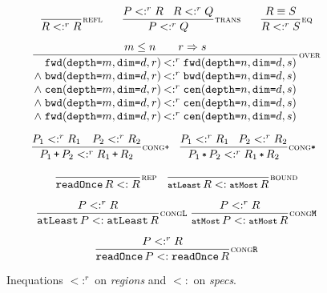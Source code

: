 \documentclass[9pt]{sigplanconf}
\theoremstyle{definition}
\newcommand{\term}[1]{\texttt{#1}}
\newcommand{\stenFwdSR}[3]{\term{fwd} (\term{depth=}#1,
  \term{dim=}#2, #3)}
\newcommand{\stenBwdSR}[3]{\term{bwd} (\term{depth=}#1,
  \term{dim=}#2, #3)}
\newcommand{\stenCenSR}[3]{\term{cen} (\term{depth=}#1,
  \term{dim=}#2, #3)}
\newcommand{\trule}[1]{\footnotesize{#1}}
\begin{document}
\begin{figure}[t]
\begin{align*}
\begin{array}{c}
%
\dfrac{}{R <:^r R}\trule{\textsc{refl}} \qquad \dfrac{P <:^r R \quad R <:^r Q}{P <:^r
  Q}\trule{\textsc{trans}} 
\qquad
\dfrac{R \equiv S}{R <:^r S}\trule{\textsc{eq}} 
\\[1.5em]
\setlength{\arraycolsep}{0.1em}
\dfrac{\hspace{3em} m \leq n \qquad r \Rightarrow s \hspace{3em}}
{\begin{array}{rl}
\stenFwdSR{m}{d}{r} & <:^r \stenFwdSR{n}{d}{s}
\\
\wedge \; \stenBwdSR{m}{d}{r} & <:^r \stenBwdSR{n}{d}{s}
\\
\wedge \; \stenCenSR{m}{d}{r} & <:^r \stenCenSR{n}{d}{s}
\\
\wedge \; \stenBwdSR{m}{d}{r} & <:^r \stenCenSR{n}{d}{s} \\
\wedge \; \stenFwdSR{m}{d}{r} & <:^r \stenCenSR{n}{d}{s} \\[1em]
\end{array}}\trule{\textsc{over}} \\
\hspace{-0.5em}
\dfrac{P_1 <:^r R_1 \quad P_2 <:^r R_2}
      {P_1 \, \texttt{+} \, P_2 <:^r R_1 \, \texttt{+} \, R_2}
\trule{\textsc{cong}\texttt{+}} \;\;\;
\dfrac{P_1 <:^r R_1 \quad P_2 <:^r R_2}
      {P_1 \, \texttt{*} \, P_2 <:^r R_1 \, \texttt{*} \, R_2}
\trule{\textsc{cong}\texttt{*}} \\[1.5em]
%
\dfrac{}{\term{readOnce} \, R <: R}\trule{\textsc{rep}}
\quad
\dfrac{}{\term{atLeast} \, R <: \term{atMost} \,
  R}\trule{\textsc{bound}} \\[1.5em]
\dfrac{P <:^r R}{\term{atLeast} \, P <: \term{atLeast} \,
  R}\trule{\textsc{cong}\texttt{L}}
\ 
\dfrac{P <:^r R}{\term{atMost} \, P <: \term{atMost} \,
  R}\trule{\textsc{cong}\texttt{M}} \\[1.5em]
\dfrac{P <:^r R}{\term{readOnce} \, P <: \term{readOnce} \,
  R}\trule{\textsc{cong}\texttt{R}} 
\end{array}
\end{align*}
\caption{Inequations $<:^r$ on \textit{regions} and
$<:$ on \textit{specs}.}
\label{fig:inequations}
\end{figure}
\end{document}
